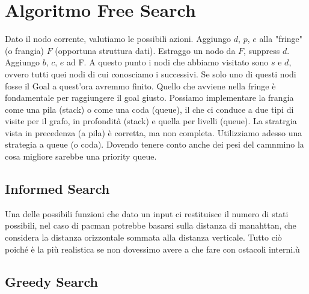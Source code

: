 \section{Algoritmo Free Search}
Dato il nodo corrente, valutiamo le possibili azioni.
Aggiungo $d$, $p$, $e$ alla "fringe" (o frangia) $F$ (opportuna struttura dati).
Estraggo un nodo da $F$, suppress $d$.
Aggiungo $b$, $c$, $e$ ad F.
A questo punto i nodi che abbiamo visitato sono $s$ e $d$, ovvero tutti quei nodi di cui conosciamo i successivi.
Se solo uno di questi nodi fosse il Goal a quest'ora avremmo finito. 
\newline
Quello che avviene nella fringe è fondamentale per raggiungere il goal giusto.
\newline
{}
Possiamo implementare la frangia come una pila (stack) o come una coda (queue), il che ci conduce a due tipi di visite per il grafo, in profondità (stack) e quella per livelli (queue).
\newline
La stratrgia vista in precedenza (a pila) è corretta, ma non completa.
Utilizziamo adesso una strategia a queue (o coda).
\newline
{}
Dovendo tenere conto anche dei pesi del camnmino la cosa migliore sarebbe una priority queue.



\subsection{Informed Search}
Una delle possibili funzioni che dato un input ci restituisce il numero di stati possibili, nel caso di pacman potrebbe basarsi sulla distanza di manahttan, che considera la distanza orizzontale sommata alla distanza verticale.
Tutto ciò poiché è la più realistica se non dovessimo avere a che fare con ostacoli interni.ù
\subsection{Greedy Search}
